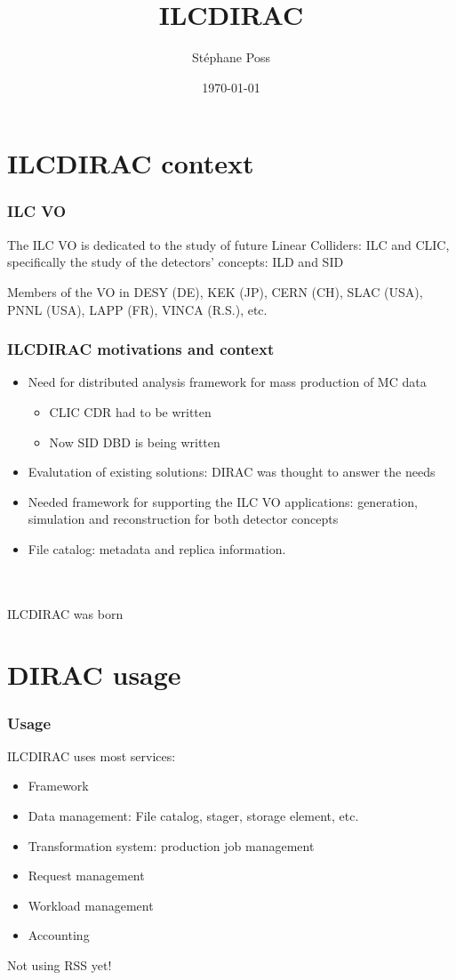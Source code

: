 \documentclass{beamer}
\title{ILCDIRAC}
\author{St\'ephane Poss}
\institute[CERN]
{
 CERN
}
\date{\today}
\begin{document}
\begin{frame}
\titlepage
\end{frame}

\begin{frame}
  \tableofcontents
\end{frame}

\section{ILCDIRAC context}
\label{sec:context}

\begin{frame}
  \frametitle{ILC VO}
The {\color{blue} ILC VO} is dedicated to the study of \alert{future
  Linear Colliders: ILC and CLIC}, specifically the study of the
detectors' concepts: ILD and SID

Members of the VO in DESY (DE), KEK (JP), CERN (CH), SLAC (USA), PNNL
(USA), LAPP (FR), VINCA (R.S.), etc.
\end{frame}

\begin{frame}
  \frametitle{ILCDIRAC motivations and context}
  \begin{itemize}
  \item Need for distributed analysis framework for mass production of
    MC data
    \begin{itemize}
    \item CLIC CDR had to be written
    \item Now SID DBD is being written
    \end{itemize}
  \item Evalutation of existing solutions: DIRAC was thought to
    answer the needs
  \item Needed framework for supporting the ILC VO applications:
    generation, simulation and reconstruction for both detector concepts 
  \item File catalog: metadata and replica information.
  \end{itemize}
~\\
~\\
\hspace{4cm} \alert{ILCDIRAC was born}

\end{frame}

\section{DIRAC usage}
\begin{frame}
  \frametitle{Usage}
ILCDIRAC uses most services:
\begin{itemize}
\item Framework
\item Data management: File catalog, stager, storage element, etc.
\item Transformation system: production job management
\item Request management
\item Workload management
\item Accounting
\end{itemize}
Not using RSS yet!
\end{frame}
\end{document}
